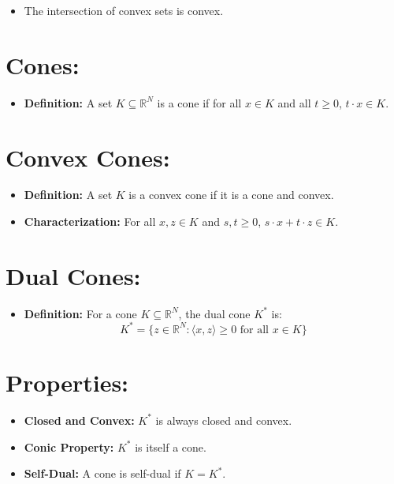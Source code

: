 \documentclass{article}
\begin{document}
\begin{itemize}[leftmargin=*]
    \item The intersection of convex sets is convex.
\end{itemize}












\section*{Cones:}
\begin{itemize}
    \item \textbf{Definition:} A set $K \subseteq \mathbb{R}^N$ is a cone if for all $x \in K$ and all $t \geq 0$, $t \cdot x \in K$.
\end{itemize}

\section*{Convex Cones:}
\begin{itemize}
    \item \textbf{Definition:} A set $K$ is a convex cone if it is a cone and convex.
    \item \textbf{Characterization:} For all $x,z \in K$ and $s, t \geq 0$, $s \cdot x + t \cdot z \in K$.
\end{itemize}

\section*{Dual Cones:}
\begin{itemize}
    \item \textbf{Definition:} For a cone $K \subseteq \mathbb{R}^N$, the dual cone $K^*$ is:
    \[
    K^* = \{z \in \mathbb{R}^N : \langle x, z \rangle \geq 0 \text{ for all } x \in K\}
    \]
\end{itemize}

\section*{Properties:}
\begin{itemize}
    \item \textbf{Closed and Convex:} $K^*$ is always closed and convex.
    \item \textbf{Conic Property:} $K^*$ is itself a cone.
    \item \textbf{Self-Dual:} A cone is self-dual if $K = K^*$.
\end{itemize}
\end{document}
